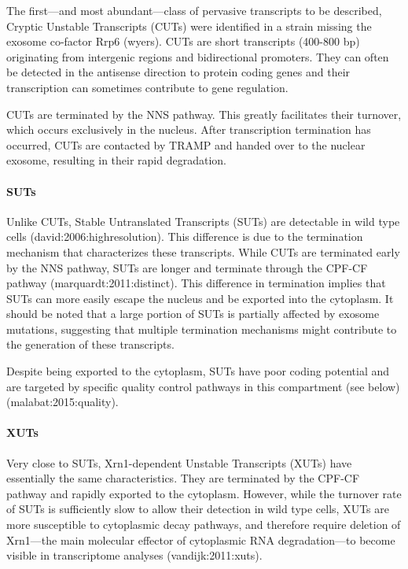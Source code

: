 The first—and most abundant—class of pervasive transcripts to be described, Cryptic Unstable Transcripts (CUTs) were identified in a strain missing the exosome co-factor Rrp6 (wyers). 
CUTs are short transcripts (400-800 bp) originating from intergenic regions and bidirectional promoters.
They can often be detected in the antisense direction to protein coding genes and their transcription can sometimes contribute to gene regulation. 

CUTs are terminated by the NNS pathway. 
This greatly facilitates their turnover, which occurs exclusively in the nucleus. 
After transcription termination has occurred, CUTs are contacted by TRAMP and handed over to the nuclear exosome, resulting in their rapid degradation.

\paragraph{SUTs}

Unlike CUTs, Stable Untranslated Transcripts (SUTs) are detectable in wild type cells (david:2006:highresolution). 
This difference is due to the termination mechanism that characterizes these transcripts. While CUTs are terminated early by the NNS pathway, SUTs are longer and terminate through the CPF-CF pathway (marquardt:2011:distinct). 
This difference in termination implies that SUTs can more easily escape the nucleus and be exported into the cytoplasm. 
It should be noted that a large portion of SUTs is partially affected by exosome mutations, suggesting that multiple termination mechanisms might contribute to the generation of these transcripts. 

Despite being exported to the cytoplasm, SUTs have poor coding potential and are targeted by specific quality control pathways in this compartment (see below) (malabat:2015:quality).

\paragraph{XUTs}

Very close to SUTs, Xrn1-dependent Unstable Transcripts (XUTs) have essentially the same characteristics.
They are terminated by the CPF-CF pathway and rapidly exported to the cytoplasm. 
However, while the turnover rate of SUTs is sufficiently slow to allow their detection in wild type cells, XUTs are more susceptible to cytoplasmic decay pathways, and therefore require deletion of Xrn1—the main molecular effector of cytoplasmic RNA degradation—to become visible in transcriptome analyses (vandijk:2011:xuts).


